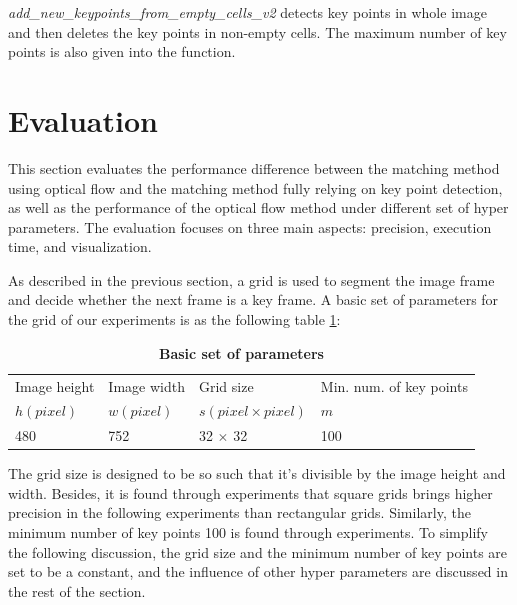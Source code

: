 \documentclass{easychair}
\begin{document}
\emph{add\_new\_keypoints\_from\_empty\_cells\_v2} detects key points in whole image and then deletes the key points in non-empty cells. The maximum number of key points is also given into the function.

\section{Evaluation}
This section evaluates the performance difference between the matching method using optical flow and the matching method fully relying on key point detection, as well as the performance of the optical flow method under different set of hyper parameters. The evaluation focuses on three main aspects: precision, execution time, and visualization.

As described in the previous section, a grid is used to segment the image frame and decide whether the next frame is a key frame. A basic set of parameters for the grid of our experiments is as the following table \ref{tab:basicset}:


\begin{table}[h!]
	\begin{center}
		\caption{\textbf{Basic set of parameters}}
		\label{tab:basicset}
		\begin{tabular}{llll} %
			Image height & Image width & Grid size& Min. num. of key points\\
			$h (pixel)$ & $w (pixel)$ & $s (pixel\times pixel)$ & $m$ \\
			\hline
			480 & 752 & 32 $\times$ 32 & 100 \\
			
		\end{tabular}
	\end{center}
\end{table}

The grid size is designed to be so such that it's divisible by the image height and width. Besides, it is found through experiments that square grids brings higher precision in the following experiments than rectangular grids. Similarly, the minimum number of key points 100 is found through experiments. To simplify the following discussion, the grid size and the minimum number of key points are set to be a constant, and the influence of other hyper parameters are discussed in the rest of the section.

\end{document}
